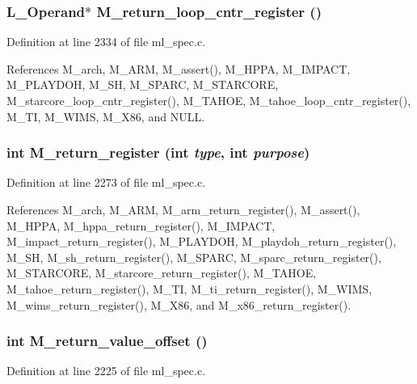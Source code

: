 \subsubsection{\setlength{\rightskip}{0pt plus 5cm}L\_\-Operand$\ast$ M\_\-return\_\-loop\_\-cntr\_\-register ()}\label{ml__spec_8c_e9934903eaae9f233a82711bb4b7f2b7}




Definition at line 2334 of file ml\_\-spec.c.

References M\_\-arch, M\_\-ARM, M\_\-assert(), M\_\-HPPA, M\_\-IMPACT, M\_\-PLAYDOH, M\_\-SH, M\_\-SPARC, M\_\-STARCORE, M\_\-starcore\_\-loop\_\-cntr\_\-register(), M\_\-TAHOE, M\_\-tahoe\_\-loop\_\-cntr\_\-register(), M\_\-TI, M\_\-WIMS, M\_\-X86, and NULL.
\subsubsection{\setlength{\rightskip}{0pt plus 5cm}int M\_\-return\_\-register (int {\em type}, int {\em purpose})}\label{ml__spec_8c_d7b1408fda044249300339cbb6bb5b99}




Definition at line 2273 of file ml\_\-spec.c.

References M\_\-arch, M\_\-ARM, M\_\-arm\_\-return\_\-register(), M\_\-assert(), M\_\-HPPA, M\_\-hppa\_\-return\_\-register(), M\_\-IMPACT, M\_\-impact\_\-return\_\-register(), M\_\-PLAYDOH, M\_\-playdoh\_\-return\_\-register(), M\_\-SH, M\_\-sh\_\-return\_\-register(), M\_\-SPARC, M\_\-sparc\_\-return\_\-register(), M\_\-STARCORE, M\_\-starcore\_\-return\_\-register(), M\_\-TAHOE, M\_\-tahoe\_\-return\_\-register(), M\_\-TI, M\_\-ti\_\-return\_\-register(), M\_\-WIMS, M\_\-wims\_\-return\_\-register(), M\_\-X86, and M\_\-x86\_\-return\_\-register().
\subsubsection{\setlength{\rightskip}{0pt plus 5cm}int M\_\-return\_\-value\_\-offset ()}\label{ml__spec_8c_b90bfd0e894f9f91975d9db558a0ed9d}




Definition at line 2225 of file ml\_\-spec.c.

